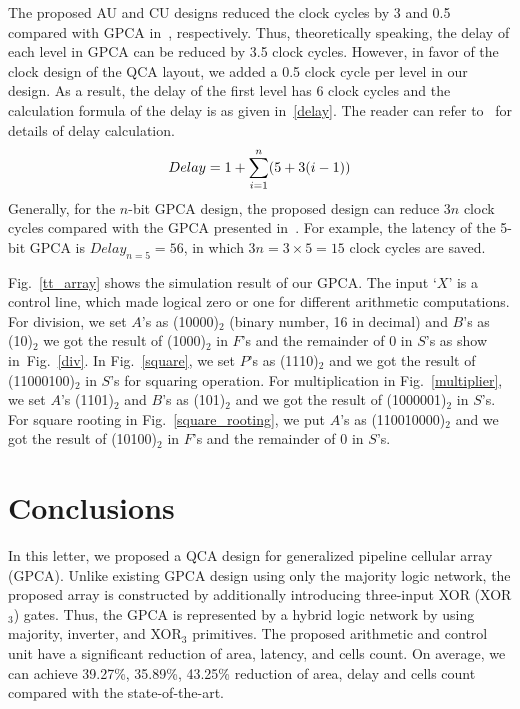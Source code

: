 \documentclass[9pt,journal,compsoc]{IEEEtran}
\begin{document}
The proposed AU and CU designs reduced the clock cycles by 3 and 0.5 compared with GPCA in~\cite{2}, respectively. Thus, theoretically speaking, the delay of each level in GPCA can be reduced by 3.5 clock cycles. However, in favor of the clock design of the QCA layout, we added a 0.5 clock cycle per level in our design. 
As a result, the delay of the first level has 6 clock cycles and the calculation formula of the delay is as given in~\eqref{delay}. The reader can refer to~\cite{2} for details of delay calculation.
\begin{equation}\label{delay}\vspace{-1ex}
\begin{split}
& Delay =1 + \sum\limits_{i=1}^{n}(5  + 3(i-1))\\
\end{split}\vspace{-1ex}
\end{equation}
Generally, for the $n$-bit GPCA design, the proposed design can reduce $3n$ clock cycles compared with the GPCA presented in~\cite{2}.
For example, the latency of the 5-bit GPCA is $Delay_{n=5}=56$, in which $3n=3 \times 5=15$ clock cycles are saved. 

Fig.~\ref{tt_array} shows the simulation result of our GPCA. The input `$X$' is a control line, which made logical zero or one for different arithmetic computations.
For division, we set $A$'s as (10000)$_2$ (binary number, 16 in decimal) and $B$'s as (10)$_2$ we got the result of (1000)$_2$ in $F$'s and the remainder of 0 in $S$'s as show in~Fig.~\ref{div}. In Fig.~\ref{square}, we set $P$'s as (1110)$_2$ and we got the result of (11000100)$_2$ in $S$'s for squaring operation. For multiplication in Fig.~\ref{multiplier}, we set $A$'s (1101)$_2$ and $B$'s as (101)$_2$ and we got the result of (1000001)$_2$ in $S$'s. For square rooting in Fig.~\ref{square_rooting}, we put $A$'s as (110010000)$_2$ and we got the result of (10100)$_2$ in $F$'s and the remainder of $0$ in $S$'s.

\vspace{-2ex}
\section{Conclusions}
In this letter, we proposed a QCA design for generalized pipeline cellular array (GPCA). 
Unlike existing GPCA design using only the majority logic network, the proposed array is constructed by additionally introducing three-input XOR (XOR$_3$) gates. Thus, the GPCA is represented by a hybrid logic network by using majority, inverter, and XOR$_3$ primitives. The proposed arithmetic and control unit have a significant reduction of area, latency, and cells count. On average, we can achieve 39.27\%, 35.89\%, 43.25\% reduction of area, delay and cells count compared with the state-of-the-art.
\end{document}
